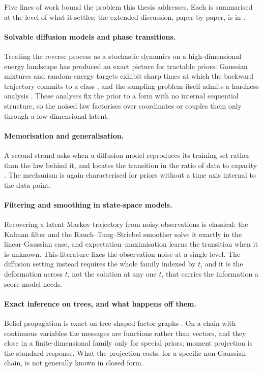 Five lines of work bound the problem this thesis addresses. Each is summarised
at the level of what it settles; the extended discussion, paper by paper, is in
\compendium{}.

\paragraph{Solvable diffusion models and phase transitions.} Treating the
reverse process as a stochastic dynamics on a high-dimensional energy landscape
has produced an exact picture for tractable priors: Gaussian mixtures and
random-energy targets exhibit sharp times at which the backward trajectory
commits to a class \citep{biroli2023generative, biroli2024dynamical,
raya2023spontaneous, achilli2026speciation}, and the sampling problem itself
admits a hardness analysis \citep{ghio2024sampling, cui2025solvable}. These
analyses fix the prior to a form with no internal sequential structure, so the
noised law factorises over coordinates or couples them only through a
low-dimensional latent.

\paragraph{Memorisation and generalisation.} A second strand asks when a
diffusion model reproduces its training set rather than the law behind it, and
locates the transition in the ratio of data to capacity
\citep{achilli2024losing, bonnaire2025memorize, kadkhodaie2024generalization,
favero2025bigger}. The mechanism is again characterised for priors without a
time axis internal to the data point.

\paragraph{Filtering and smoothing in state-space models.} Recovering a latent
Markov trajectory from noisy observations is classical: the Kalman filter
\citep{kalman1960new} and the Rauch--Tung--Striebel smoother
\citep{rauch1965maximum} solve it exactly in the linear-Gaussian case, and
expectation--maximisation \citep{dempster1977maximum} learns the transition when
it is unknown. This literature fixes the observation noise at a single level.
The diffusion setting instead requires the whole family indexed by $t$, and it
is the deformation across $t$, not the solution at any one $t$, that carries the
information a score model needs.

\paragraph{Exact inference on trees, and what happens off them.} Belief
propagation is exact on tree-shaped factor graphs \citep{pearl1988probabilistic,
mezard2009information}. On a chain with continuous variables the messages are
functions rather than vectors, and they close in a finite-dimensional family
only for special priors; moment projection \citep{minka2001} is the standard
response. What the projection costs, for a specific non-Gaussian chain, is not
generally known in closed form.

